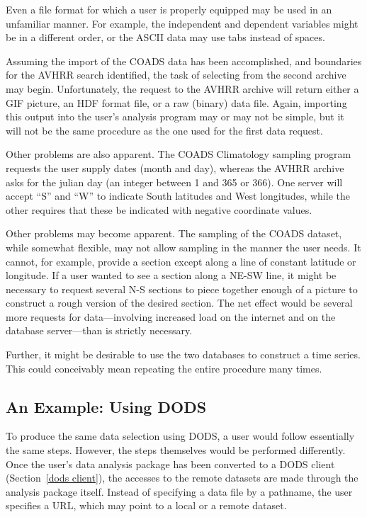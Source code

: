 Even a file format for which a user is properly equipped may be used
in an unfamiliar manner. For example, the independent and dependent
variables might be in a different order, or the ASCII data may use
tabs instead of spaces.

Assuming the import of the COADS data has been accomplished, and
boundaries for the AVHRR search identified, the task of selecting from
the second archive may begin. Unfortunately, the request to the AVHRR
archive will return either a GIF picture, an HDF format file, or a raw
(binary) data file. Again, importing this output into the user's
analysis program may or may not be simple, but it will not be the same
procedure as the one used for the first data request.

Other problems are also apparent. The COADS Climatology sampling
program requests the user supply dates (month and day), whereas the
AVHRR archive asks for the julian day (an integer between 1 and 365 or
366). One server will accept ``S'' and ``W'' to indicate South
latitudes and West longitudes, while the other requires that these be
indicated with negative coordinate values.

Other problems may become apparent. The sampling of the COADS dataset,
while somewhat flexible, may not allow sampling in the manner the user
needs. It cannot, for example, provide a section except along a line
of constant latitude or longitude. If a user wanted to see a section
along a NE-SW line, it might be necessary to request several N-S
sections to piece together enough of a picture to construct a rough
version of the desired section. The net effect would be several more
requests for data---involving increased load on the internet and on
the database server---than is strictly necessary.

Further, it might be desirable to use the two databases to construct a
time series. This could conceivably mean repeating the entire
procedure many times.

\subsection{An Example: Using DODS}

To produce the same data selection using DODS, a user would follow
essentially the same steps. However, the steps themselves would be
performed differently. Once the user's data analysis package has been
converted to a DODS client (Section~\ref{dods client}), the accesses
to the remote datasets are made through the analysis package
itself. Instead of specifying a data file by a pathname, the user
specifies a URL, which may point to a local or a remote dataset.

